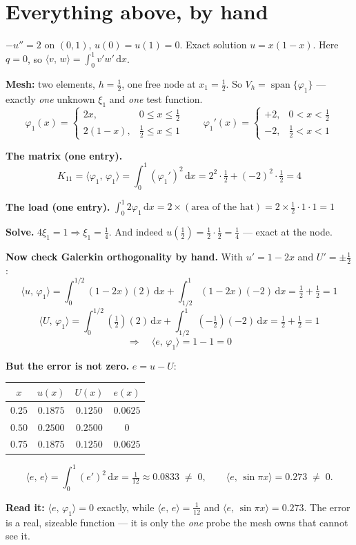 \documentclass[11pt]{article}
\newcommand{\dx}{\,\mathrm{d}x}
\newcommand{\ip}[2]{\bigl\langle #1,\,#2\bigr\rangle}
\newcommand{\Vh}{V_{h}}
\begin{document}
\section{Everything above, by hand}\label{sec:worked}

\begin{worked}
$-u''=2$ on $(0,1)$, $u(0)=u(1)=0$. Exact solution $u=x(1-x)$. Here $q=0$, so
$\ip{v}{w}=\int_0^1 v'w'\dx$.

\textbf{Mesh:} two elements, $h=\tfrac12$, one free node at $x_1=\tfrac12$. So
$\Vh=\operatorname{span}\{\varphi_1\}$ --- exactly \emph{one} unknown $\xi_1$
and \emph{one} test function.
\[
  \varphi_1(x)=\begin{cases}2x, & 0\le x\le\tfrac12\\[2pt] 2(1-x), & \tfrac12\le x\le1\end{cases}
  \qquad
  \varphi_1'(x)=\begin{cases}+2, & 0<x<\tfrac12\\[2pt] -2, & \tfrac12<x<1\end{cases}
\]

\textbf{The matrix (one entry).}
\[
  K_{11}=\ip{\varphi_1}{\varphi_1}=\int_0^1(\varphi_1')^2\dx
        =2^2\cdot\tfrac12+(-2)^2\cdot\tfrac12=\boxed{4}
\]

\textbf{The load (one entry).} $\int_0^1 2\varphi_1\dx = 2\times(\text{area of the hat})
=2\times\tfrac12\cdot1\cdot1=\boxed{1}$

\textbf{Solve.} $4\xi_1=1\Rightarrow \xi_1=\tfrac14$. And indeed
$u(\tfrac12)=\tfrac12\cdot\tfrac12=\tfrac14$ --- exact at the node.

\medskip
\textbf{Now check Galerkin orthogonality by hand.} With $u'=1-2x$ and
$U'=\pm\tfrac12$:
\[
  \ip{u}{\varphi_1}=\int_0^{1/2}\!\!(1-2x)(2)\dx+\int_{1/2}^{1}\!\!(1-2x)(-2)\dx
   =\tfrac12+\tfrac12=1
\]
\[
  \ip{U}{\varphi_1}=\int_0^{1/2}\!\!(\tfrac12)(2)\dx+\int_{1/2}^{1}\!\!(-\tfrac12)(-2)\dx
   =\tfrac12+\tfrac12=1
\]
\[
  \Longrightarrow\quad \ip{e}{\varphi_1}=1-1=\boxed{0}
\]

\medskip
\textbf{But the error is not zero.} $e=u-U$:
\begin{center}\small
\begin{tabular}{@{}cccc@{}}
\toprule
$x$ & $u(x)$ & $U(x)$ & $e(x)$\\
\midrule
$0.25$ & $0.1875$ & $0.1250$ & $0.0625$\\
$0.50$ & $0.2500$ & $0.2500$ & $0$\\
$0.75$ & $0.1875$ & $0.1250$ & $0.0625$\\
\bottomrule
\end{tabular}
\end{center}
\[
  \ip{e}{e}=\int_0^1(e')^2\dx=\tfrac{1}{12}\approx0.0833\;\neq\;0,
  \qquad
  \ip{e}{\sin\pi x}=0.273\;\neq\;0 .
\]

\textbf{Read it:} $\ip{e}{\varphi_1}=0$ exactly, while $\ip{e}{e}=\tfrac1{12}$
and $\ip{e}{\sin\pi x}=0.273$. The error is a real, sizeable function --- it is
only the \emph{one} probe the mesh owns that cannot see it.
\end{worked}
\end{document}
